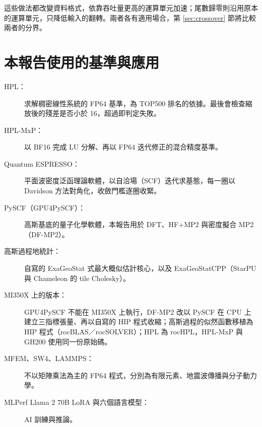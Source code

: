 這些做法都改變資料格式，依靠吞吐量更高的運算單元加速；尾數歸零則沿用原本的運算單元，只降低輸入的翻轉。兩者各有適用場合，第 \ref{sec:crossover} 節將比較兩者的分界。

\section{本報告使用的基準與應用}\label{sec:workloads}

\begin{description}
  \item[HPL：] 求解稠密線性系統的 FP64 基準，為 TOP500 排名的依據。最後會檢查縮放後的殘差是否小於 16，超過即判定失敗。
  \item[HPL-MxP：] 以 BF16 完成 LU 分解、再以 FP64 迭代修正的混合精度基準。
  \item[Quantum ESPRESSO：] 平面波密度泛函理論軟體，以自洽場（SCF）迭代求基態，每一圈以 Davidson 方法對角化，收斂門檻逐圈收緊。
  \item[PySCF（GPU4PySCF）：] 高斯基底的量子化學軟體，本報告用於 DFT、HF+MP2 與密度擬合 MP2（DF-MP2）。
  \item[高斯過程地統計：] 自寫的 ExaGeoStat 式最大概似估計核心，以及 ExaGeoStatCPP（StarPU 與 Chameleon 的 tile Cholesky）。
  \item[MI350X 上的版本：] GPU4PySCF 不能在 MI350X 上執行，DF-MP2 改以 PySCF 在 CPU 上建立三指標張量、再以自寫的 HIP 程式收縮；高斯過程的似然函數移植為 HIP 程式（rocBLAS／rocSOLVER）；HPL 為 rocHPL，HPL-MxP 與 GH200 使用同一份原始碼。
  \item[MFEM、SW4、LAMMPS：] 不以矩陣乘法為主的 FP64 程式，分別為有限元素、地震波傳播與分子動力學。
  \item[MLPerf Llama 2 70B LoRA 與六個語言模型：] AI 訓練與推論。
\end{description}
